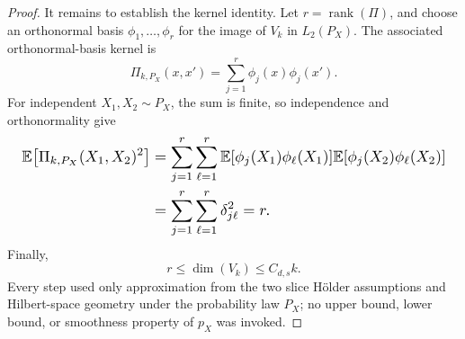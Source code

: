\documentclass{article}
\begin{document}
\begin{proof}
It remains to establish the kernel identity. Let \(r=\operatorname{rank}(\Pi)\), and choose an orthonormal basis \(\phi_1,\ldots,\phi_r\) for the image of \(V_k\) in \(L_2(P_X)\). The associated orthonormal-basis kernel is
\[
\Pi_{k,P_X}(x,x')=\sum_{j=1}^r\phi_j(x)\phi_j(x').
\]
For independent \(X_1,X_2\sim P_X\), the sum is finite, so independence and orthonormality give
\[
\makebox[\linewidth][c]{\resizebox{0.98\linewidth}{!}{\(\displaystyle \begin{aligned}
\mathbb E\!\left[\Pi_{k,P_X}(X_1,X_2)^2\right]
&=\sum_{j=1}^r\sum_{\ell=1}^r
\mathbb E[\phi_j(X_1)\phi_\ell(X_1)]
\mathbb E[\phi_j(X_2)\phi_\ell(X_2)]\\
&=\sum_{j=1}^r\sum_{\ell=1}^r\delta_{j\ell}^2
=r.
\end{aligned}\)}}
\]
Finally,
\[
r\le\dim(V_k)\le C_{d,s}k.
\]
Every step used only approximation from the two slice H\"older assumptions and Hilbert-space geometry under the probability law \(P_X\); no upper bound, lower bound, or smoothness property of \(p_X\) was invoked.
\end{proof}
\end{document}
